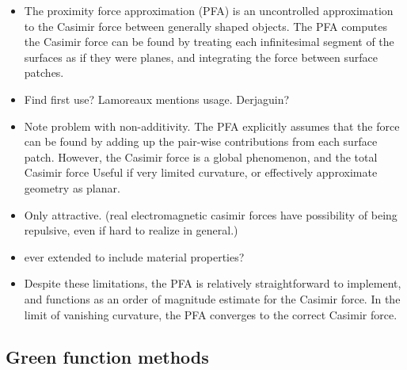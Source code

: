 \begin{itemize}
\begin{itemize}
\item The proximity force approximation (PFA) is an uncontrolled approximation to
the Casimir force between generally shaped objects.  
The PFA computes the Casimir force can be found by treating each infinitesimal segment
of the surfaces as if they were planes, and integrating the force between surface patches.
\item Find first use?  Lamoreaux mentions usage.  Derjaguin?\cite{Derjaguin1956}
\item Note problem with non-additivity. The PFA explicitly assumes that the force
can be found by adding up the pair-wise contributions from each surface patch.  
However, the Casimir force is a global phenomenon, and the total Casimir force
Useful if very limited curvature, or effectively approximate geometry as planar.  
\item Only attractive.  (real electromagnetic casimir forces have possibility of 
being repulsive, even if hard to realize in general.)
\item ever extended to include material properties?
\item Despite these limitations, the PFA is relatively straightforward to implement,
and functions as an order of magnitude estimate for the Casimir force.  In the limit
of vanishing curvature, the PFA converges to the correct Casimir force.  
\end{itemize}

\subsection{Green function methods}


\end{itemize}
